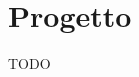 \documentclass{llncs}
\newcommand{\labelsec}[1]{\label{sec:#1}}
\newcommand{\labelssec}[1]{\label{ssec:#1}}
\begin{document}

\section{Progetto}\labelsec{project}
TODO %









\newpage


\end{document}
